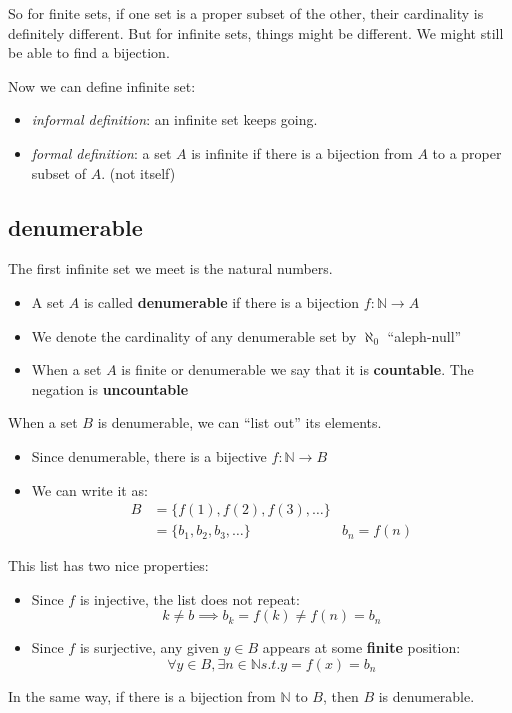\documentclass[letterpaper,12pt]{article}
\begin{document}
So for finite sets, if one set is a proper subset of the other, their cardinality is definitely different. But for infinite sets, things might be different. We might still be able to find a bijection. 

Now we can define infinite set:\begin{itemize}
    \item \textit{informal definition}: an infinite set keeps going.
    \item \textit{formal definition}: a set $A$ is infinite if there is a bijection from $A$ to a proper subset of $A$. (not itself)
\end{itemize}

\subsection{denumerable}
The first infinite set we meet is the natural numbers.
\begin{itemize}
    \item A set $A$ is called \textbf{denumerable} if there is a bijection $f : \mathbb{N} \to A$
    \item We denote the cardinality of any denumerable set by $\aleph_0$ ``aleph-null''
    \item When a set $A$ is finite or denumerable we say that it is \textbf{countable}. The negation is \textbf{uncountable}
\end{itemize}

When a set $B$ is denumerable, we can ``list out'' its elements.\begin{itemize}
    \item Since denumerable, there is a bijective $f:\mathbb{N}\to B$
    \item We can write it as:\begin{align*}
        B&=\{f(1),f(2),f(3),\ldots\} &\\
        &=\{b_1,b_2,b_3,\ldots\}&b_n=f(n)
    \end{align*}
\end{itemize}
This list has two nice properties:\begin{itemize}
    \item Since $f$ is injective, the list does not repeat:\[k\neq b\implies b_k=f(k)\neq f(n)=b_n\]
    \item Since $f$ is surjective, any given $y\in B$ appears at some \textbf{finite} position:\[\forall y\in B, \exists n\in \mathbb{N}s.t.y=f(x)=b_n\]
\end{itemize}
In the same way, if there is a bijection from $\mathbb{N}$ to $B$, then $B$ is denumerable. 
\end{document}
